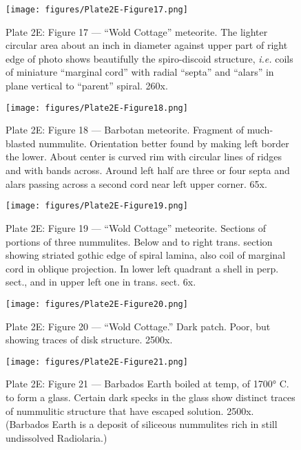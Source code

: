 \documentclass[a4paper, 12pt, oneside]{article}
\begin{document}
\cfoot{\thepage}
\begin{figure}[b]
\centering
\texttt{[image: figures/Plate2E-Figure17.png]}
\caption{\small Plate 2E: Figure 17 --- ``Wold Cottage'' meteorite. The lighter circular area about an inch in diameter against upper part of right edge of photo shows beautifully the spiro-discoid structure, \emph{i.e.} coils of miniature ``marginal cord'' with radial ``septa'' and ``alars'' in plane vertical to ``parent'' spiral. 260x.}
\end{figure}
\clearpage
\begin{figure}[b]
\centering
\texttt{[image: figures/Plate2E-Figure18.png]}
\caption{\small Plate 2E: Figure 18 --- Barbotan meteorite. Fragment of much-blasted nummulite. Orientation better found by making left border the lower. About center is curved rim with circular lines of ridges and with bands across. Around left half are three or four septa and alars passing across a second cord near left upper corner. 65x.}
\end{figure}
\clearpage
\begin{figure}[b]
\centering
\texttt{[image: figures/Plate2E-Figure19.png]}
\caption{\small Plate 2E: Figure 19 --- ``Wold Cottage'' meteorite. Sections of portions of three nummulites. Below and to right trans. section showing striated gothic edge of spiral lamina, also coil of marginal cord in oblique projection. In lower left quadrant a shell in perp. sect., and in upper left one in trans. sect. 6x.}
\end{figure}
\clearpage
\begin{figure}[b]
\centering
\texttt{[image: figures/Plate2E-Figure20.png]}
\caption{\small Plate 2E: Figure 20 --- ``Wold Cottage.'' Dark patch. Poor, but showing traces of disk structure. 2500x.}
\end{figure}
\clearpage
\begin{figure}[b]
\centering
\texttt{[image: figures/Plate2E-Figure21.png]}
\caption{\small Plate 2E: Figure 21 --- Barbados Earth boiled at temp, of 1700° C. to form a glass. Certain dark specks in the glass show distinct traces of nummulitic structure that have escaped solution. 2500x. (Barbados Earth is a deposit of siliceous nummulites rich in still undissolved Radiolaria.)}
\end{figure}
\end{document}
